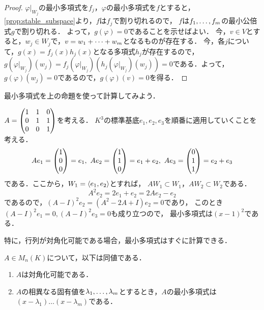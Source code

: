 \begin{proof}
$\varphi|_{W_j}$の最小多項式を$f_j$，$\varphi$の最小多項式を$f$とすると，
\cref{prop:stable_subspace}より，$f$は$f_j$で割り切れるので，
$f$は$\idxdot{f}{1}{m}$の最小公倍式$g$で割り切れる．
よって，$g(\varphi)=0$であることを示せばよい．
今，$v \in V$とすると，$w_j \in W_j$で，$v=\idxsum{w}{1}{m}{+}$となるものが存在する．
今，各$j$について，$g(x)=f_j(x)h_j(x)$となる多項式$h_j$が存在するので，
$g(\varphi|_{W_j})(w_j) = f_j(\varphi|_{W_j})(h_j(\varphi|_{W_j})(w_j)) = 0$である．よって，$g(\varphi)(w_j) =0$であるので，$g(\varphi)(v)=0$を得る．
\end{proof}
最小多項式を上の命題を使って計算してみよう．
\begin{example}
$A = \pmt{1 & 1 & 0 \\ 0 & 1 & 1 \\ 0 & 0 & 1}$を考える．
$K^3$の標準基底$e_1,e_2,e_3$を順番に適用していくことを考える．
\[
        A e_1 = \pmt{1 \\ 0 \\ 0} = e_1,\  
        A e_2 = \pmt{1 \\ 1 \\ 0} = e_1 + e_2,\ 
        A e_3 = \pmt{0 \\ 1 \\ 1} = e_2 + e_3
\]
である．ここから，$W_1 = \gen{e_1,e_2}$とすれば，
$AW_1 \subset W_1$，$AW_2 \subset W_2$である．
\[
    A^2 e_2 = 2 e_1 + e_2 = 2A e_2 - e_2  
\]
であるので，$(A-I)^2 e_2 = (A^2 - 2A + I)e_2 = 0$であり，
このとき$(A-I)^2 e_1 = 0, (A-I)^2 e_3 = 0$も成り立つので，
最小多項式は$(x-1)^2$である．
\end{example}
特に，行列が対角化可能である場合，最小多項式はすぐに計算できる．
\begin{prop}
$A \in M_n(K)$について，以下は同値である．
\begin{enumerate}
    \item $A$は対角化可能である．
    \item $A$の相異なる固有値を$\idxdot{\lambda}{1}{m}$とするとき，$A$の最小多項式は$(x-\lambda_1)\dots(x-\lambda_m)$である．
\end{enumerate}
\end{prop}
